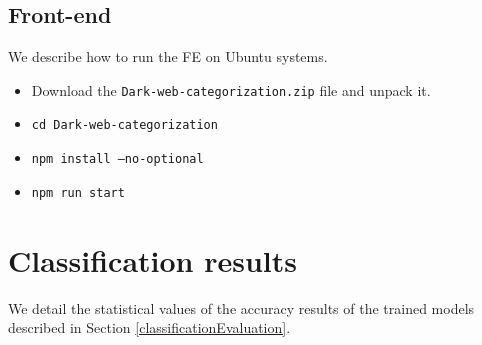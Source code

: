 \begin{appendices}
\section{Front-end}
We describe how to run the FE on Ubuntu systems.
\begin{itemize}
    \item Download the \texttt{Dark-web-categorization.zip} file and unpack it.
    \item \texttt{cd Dark-web-categorization}
    \item \texttt{npm install --no-optional}
    \item \texttt{npm run start}
\end{itemize}


\chapter{Classification results}
We detail the statistical values of the accuracy results of the trained models described in Section \ref{classificationEvaluation}.


\end{appendices}
